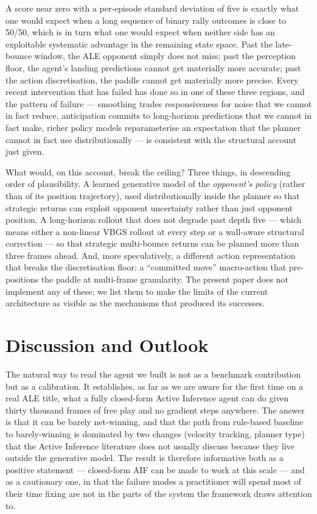 \documentclass[runningheads]{llncs}
\begin{document}
A score near zero with a per-episode standard deviation of five is
exactly what one would expect when a long sequence of binary
rally outcomes is close to 50/50, which is in turn what one would
expect when neither side has an exploitable systematic advantage
in the remaining state space. Past the late-bounce window, the ALE
opponent simply does not miss; past the perception floor, the
agent's landing predictions cannot get materially more accurate;
past the action discretisation, the paddle cannot get materially
more precise. Every recent intervention that has failed has done so
in one of these three regions, and the pattern of failure ---
smoothing trades responsiveness for noise that we cannot in fact
reduce, anticipation commits to long-horizon predictions that we
cannot in fact make, richer policy models reparameterise an
expectation that the planner cannot in fact use distributionally
--- is consistent with the structural account just given.

What would, on this account, break the ceiling? Three things, in
descending order of plausibility. A learned generative model of the
\emph{opponent's policy} (rather than of its position trajectory),
used distributionally inside the planner so that strategic returns
can exploit opponent uncertainty rather than just opponent
position. A long-horizon rollout that does not degrade past depth
five --- which means either a non-linear VBGS rollout at every
step or a wall-aware structural correction --- so that strategic
multi-bounce returns can be planned more than three frames ahead.
And, more speculatively, a different action representation that
breaks the discretisation floor: a ``committed move'' macro-action
that pre-positions the paddle at multi-frame granularity. The
present paper does not implement any of these; we list them to
make the limits of the current architecture as visible as the
mechanisms that produced its successes.

\section{Discussion and Outlook}\label{sec:discussion}

The natural way to read the agent we built is not as a benchmark
contribution but as a calibration. It establishes, as far as we are
aware for the first time on a real ALE title, what a fully
closed-form Active Inference agent can do given thirty thousand
frames of free play and no gradient steps anywhere. The answer is
that it can be barely net-winning, and that the path from
rule-based baseline to barely-winning is dominated by two changes
(velocity tracking, planner type) that the Active Inference
literature does not usually discuss because they live outside the
generative model. The result is therefore informative both as a
positive statement --- closed-form AIF can be made to work at this
scale --- and as a cautionary one, in that the failure modes a
practitioner will spend most of their time fixing are not in the
parts of the system the framework draws attention to.
\end{document}
